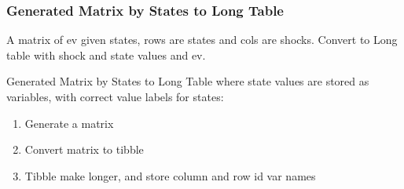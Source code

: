 \documentclass[
]{book}
\providecommand{\tightlist}{%
  \setlength{\itemsep}{0pt}\setlength{\parskip}{0pt}}
\begin{document}
\hypertarget{generated-matrix-by-states-to-long-table}{%
\subsubsection{Generated Matrix by States to Long Table}\label{generated-matrix-by-states-to-long-table}}

A matrix of ev given states, rows are states and cols are shocks. Convert to Long table with shock and state values and ev.

Generated Matrix by States to Long Table where state values are stored as variables, with correct value labels for states:

\begin{enumerate}
\def\labelenumi{\arabic{enumi}.}
\tightlist
\item
  Generate a matrix
\item
  Convert matrix to tibble
\item
  Tibble make longer, and store column and row id var names
\end{enumerate}
\end{document}
